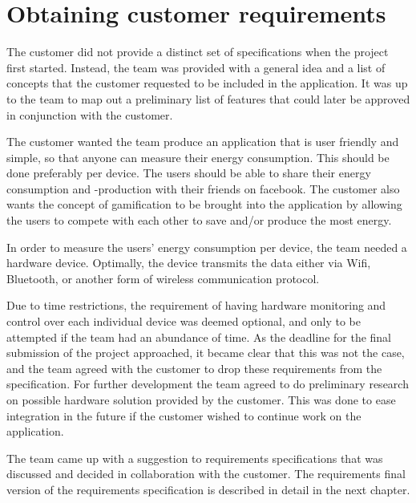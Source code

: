 \section{Obtaining customer requirements}
\label{sec:obtainingreq}

The customer did not provide a distinct set of specifications when the project first started. Instead, the team was provided with a general idea and a list of concepts that the customer requested to be included in the application. It was up to the team to map out a preliminary list of features that could later be approved in conjunction with the customer. 

The customer wanted the team produce an application that is user friendly and simple, 
so that anyone can measure their energy consumption. This should be done preferably per device. The users should be able to share their energy consumption and -production with their friends on \gls{facebook}. 
The customer also wants the concept of \gls{gamification} to be brought into the application by allowing the users to compete with each other to save and/or produce the most energy. 

In order to measure the users' energy consumption per device, the team needed a hardware device. Optimally, the device transmits the data either via Wifi, Bluetooth, or another form of wireless communication protocol.

Due to time restrictions, the requirement of having hardware monitoring and control over each individual device was deemed optional, and only to be attempted if the team had an abundance of time. As the deadline for the final submission of the project approached, it became clear that this was not the case, and the team agreed with the customer to drop these requirements from the specification. For further development the team agreed to do preliminary research on possible hardware solution provided by the customer. This was done to ease integration in the future if the customer wished to continue work on the application.

The team came up with a suggestion to requirements specifications that was discussed and decided in collaboration with the customer. The requirements final version of the requirements specification is described in detail in the next chapter.